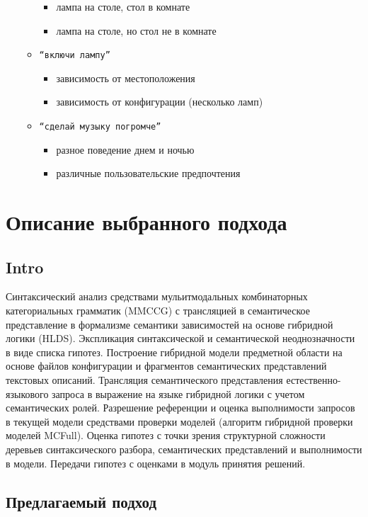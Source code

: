 \documentclass[a4paper,12pt]{article}
\begin{document}
\begin{itemize}
\begin{itemize}
\begin{itemize}
					\item лампа на столе, стол в комнате
					\item лампа на столе, но стол не в комнате
				\end{itemize}
			\item \texttt{``включи лампу''}
				\begin{itemize}
					\item зависимость от местоположения
					\item зависимость от конфигурации (несколько ламп)
				\end{itemize}
			\item \texttt{``сделай музыку погромче''}
				\begin{itemize}
					\item разное поведение днем и ночью
					\item различные пользовательские предпочтения
				\end{itemize}
		\end{itemize}
\end{itemize}






\section{Описание выбранного подхода}

\subsection{Intro}
Синтаксический анализ средствами мульитмодальных комбинаторных категориальных грамматик (MMCCG) с трансляцией в семантическое представление в формализме семантики зависимостей на основе гибридной логики (HLDS). Экспликация синтаксической и семантической неоднозначности в виде списка гипотез. Построение гибридной модели предметной области на основе файлов конфигурации и фрагментов семантических представлений текстовых описаний. Трансляция семантического представления естественно-языкового запроса в выражение на языке гибридной логики с учетом семантических ролей. Разрешение референции и оценка выполнимости запросов в текущей модели средствами проверки моделей (алгоритм гибридной проверки моделей MCFull). Оценка гипотез с точки зрения структурной сложности деревьев синтаксического разбора, семантических представлений и выполнимости в модели. Передачи гипотез с оценками в модуль принятия решений.


\subsection{Предлагаемый подход}
\end{document}
